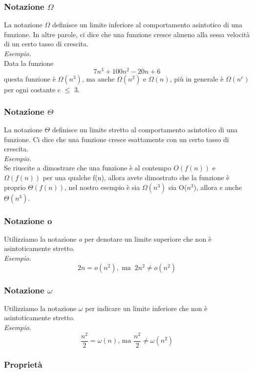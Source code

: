 \subsubsection{Notazione  $\Omega$}
La notazione $\Omega$ definisce un limite inferiore al comportamento asintotico di una funzione. In altre parole, ci dice che una funzione cresce almeno alla sessa velocità di un certo tasso di crescita.\medskip\\
\textit{Esempio.}\\
Data la funzione 
$$7n^3+100n^2-20n+6$$
questa funzione è $\Omega(n^3)$, ma anche $\Omega(n^2)$ e $\Omega(n)$, più in generale è $\Omega(n^c)$ per ogni costante c $\le$ 3.

\subsubsection{Notazione $\Theta$}
La notazione $\Theta$ definisce un limite stretto al comportamento asintotico di una funzione. Ci dice che una funzione cresce esattamente con un certo tasso di crescita.\medskip\\
\textit{Esempio.}\\
Se riuscite a dimostrare che una funzione è al contempo $O(f(n))$ e $\Omega(f(n))$ per una qualche f(n), allora avete dimostrato che la funzione è proprio $\Theta(f(n))$, nel nostro esempio è sia $\Omega(n^3)$ sia O($n^3$), allora e anche $\Theta(n^3)$.

\subsubsection{Notazione o}
Utilizziamo la notazione \textit{o} per denotare un limite superiore che non è asintoticamente stretto.\smallskip\\
\textit{Esempio.}
$$2n = o(n^2), \text{ ma }\  2n^2 \neq o(n^2)$$

\subsubsection{Notazione $\omega$}
Utilizziamo la notazione $\omega$ per indicare un limite inferiore che  non è asintoticamente stretto.\smallskip\\
\textit{Esempio.}
$$\frac{n^2}{2}=\omega(n) \text{, ma } \frac{n^2}{2} \neq \omega (n^2)$$

\subsubsection{Proprietà}
